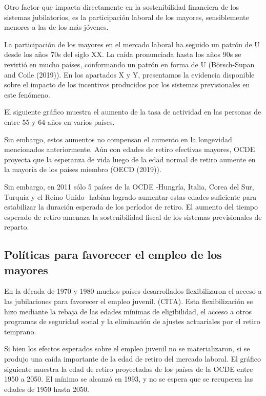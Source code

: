 \documentclass[]{article}
\begin{document}
Otro factor que impacta directamente en la sostenibilidad financiera de
los sistemas jubilatorios, es la participación laboral de los mayores,
sensiblemente menores a las de los más jóvenes.

La participación de los mayores en el mercado laboral ha seguido un
patrón de U desde los años 70s del siglo XX. La caída pronunciada hasta
los años 90s se revirtió en mucho países, conformando un patrón en forma
de U (Börsch-Supan and Coile (2019)). En los apartados X y Y,
presentamos la evidencia disponible sobre el impacto de los incentivos
producidos por los sistemas previsionales en este fenómeno.

El siguiente gráfico muestra el aumento de la tasa de actividad en las
personas de entre 55 y 64 años en varios países.

Sin embargo, estos aumentos no compensan el aumento en la longevidad
mencionados anteriormente. Aún con edades de retiro efectivas mayores,
OCDE proyecta que la esperanza de vida luego de la edad normal de retiro
aumente en la mayoría de los países miembro (OECD (2019)).

Sin embargo, en 2011 sólo 5 países de la OCDE -Hungría, Italia, Corea
del Sur, Turquía y el Reino Unido- habían logrado aumentar estas edades
suficiente para estabilizar la duración esperada de los períodos de
retiro. El aumento del tiempo esperado de retiro amenaza la
sostenibilidad fiscal de los sistemas previsionales de reparto.

\hypertarget{poluxedticas-para-favorecer-el-empleo-de-los-mayores}{%
\subsection{Políticas para favorecer el empleo de los
mayores}\label{poluxedticas-para-favorecer-el-empleo-de-los-mayores}}

En la década de 1970 y 1980 muchos países desarrollados flexibilizaron
el acceso a las jubilaciones para favorecer el empleo juvenil. (CITA).
Esta flexibilización se hizo mediante la rebaja de las edades mínimas de
eligibilidad, el acceso a otros programas de seguridad social y la
eliminación de ajustes actuariales por el retiro temprano.

Si bien los efectos esperados sobre el empleo juvenil no se
materializaron, si se produjo una caída importante de la edad de retiro
del mercado laboral. El gráfico siguiente muestra la edad de retiro
proyectadas de los países de la OCDE entre 1950 a 2050. El mínimo se
alcanzó en 1993, y no se espera que se recuperen las edades de 1950
hasta 2050.
\end{document}
